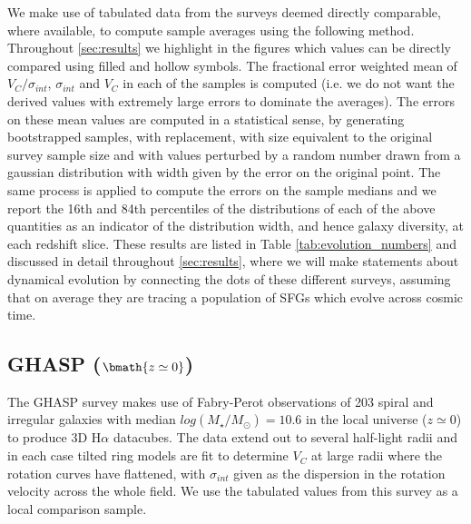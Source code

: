 \documentclass[fleqn,usenatbib]{mn2e}
\begin{document}
We make use of tabulated data from the surveys deemed directly comparable, where available, to compute sample averages using the following method. 
Throughout \cref{sec:results} we highlight in the figures which values can be directly compared using filled and hollow symbols.
The fractional error weighted mean of $V_{C}/\sigma_{int}$, $\sigma_{int}$ and $V_{C}$ in each of the samples is computed (i.e. we do not want the derived values with extremely large errors to dominate the averages).
The errors on these mean values are computed in a statistical sense, by generating bootstrapped samples, with replacement, with size equivalent to the original survey sample size and with values perturbed by a random number drawn from a gaussian distribution with width given by the error on the original point.
The same process is applied to compute the errors on the sample medians and we report the 16th and 84th percentiles of the distributions of each of the above quantities as an indicator of the distribution width, and hence galaxy diversity, at each redshift slice.
These results are listed in Table \ref{tab:evolution_numbers} and discussed in detail throughout \cref{sec:results}, where we will make statements about dynamical evolution by connecting the dots of these different surveys, assuming that on average they are tracing a population of SFGs which evolve across cosmic time. 

\subsection{GHASP ($\bmath{z\simeq0}$)}\label{subsec:GHASP}
The GHASP survey \citep[E08]{Epinat2008,Epinat2008a} makes use of Fabry-Perot observations of 203 spiral and irregular galaxies with median $log(M_{\star}/M_{\odot})=10.6$ in the local universe ($z\simeq0$) to produce 3D H$\alpha$ datacubes.
The data extend out to several half-light radii and in each case tilted ring models are fit to determine $V_{C}$ at large radii where the rotation curves have flattened, with $\sigma_{int}$ given as the dispersion in the rotation velocity across the whole field.
We use the tabulated values from this survey as a local comparison sample.
\end{document}
